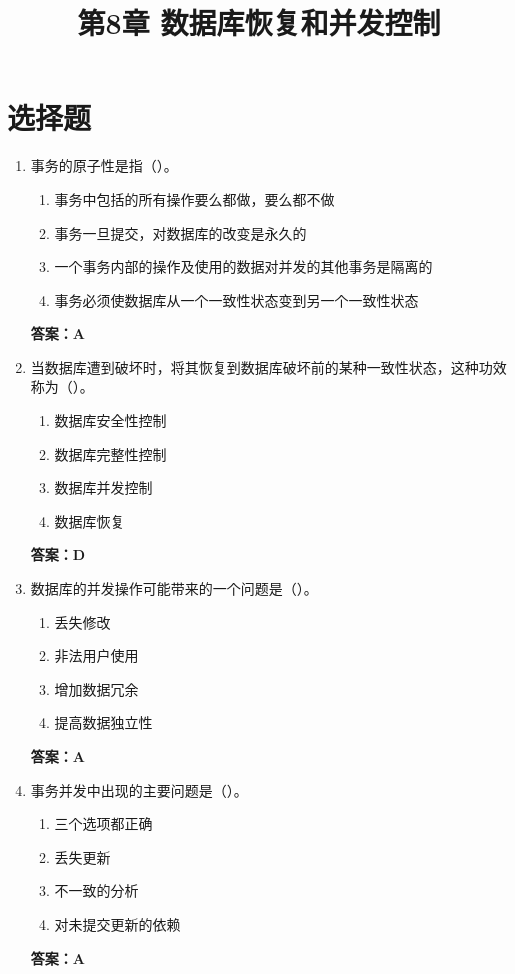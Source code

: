 \documentclass[12pt, a4paper]{article}
\title{\textbf{第8章 数据库恢复和并发控制}}
\date{}
\begin{document}
\section{选择题}

\begin{enumerate}[label=\arabic*.]
	\item 事务的原子性是指（\quad）。
	      \begin{enumerate}
		      \item 事务中包括的所有操作要么都做，要么都不做
		      \item 事务一旦提交，对数据库的改变是永久的
		      \item 一个事务内部的操作及使用的数据对并发的其他事务是隔离的
		      \item 事务必须使数据库从一个一致性状态变到另一个一致性状态
	      \end{enumerate}
	      \textbf{答案：A}

	\item 当数据库遭到破坏时，将其恢复到数据库破坏前的某种一致性状态，这种功效称为（\quad）。
	      \begin{enumerate}
		      \item 数据库安全性控制
		      \item 数据库完整性控制
		      \item 数据库并发控制
		      \item 数据库恢复
	      \end{enumerate}
	      \textbf{答案：D}

	\item 数据库的并发操作可能带来的一个问题是（\quad）。
	      \begin{enumerate}
		      \item 丢失修改
		      \item 非法用户使用
		      \item 增加数据冗余
		      \item 提高数据独立性
	      \end{enumerate}
	      \textbf{答案：A}

	\item 事务并发中出现的主要问题是（\quad）。
	      \begin{enumerate}
		      \item 三个选项都正确
		      \item 丢失更新
		      \item 不一致的分析
		      \item 对未提交更新的依赖
	      \end{enumerate}
	      \textbf{答案：A}


\end{enumerate}
\end{document}
